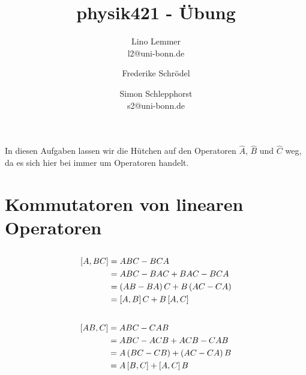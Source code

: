 

\setcounter{thezettel}{6}
\renewcommand\thesection{\arabic{thezettel}.\arabic{section}}

\newcommand\ccancel[2][black]{\renewcommand\CancelColor{\color{#1}}\cancel{#2}}


\title{physik421 - Übung }
\author{Lino Lemmer \\ \small{l2@uni-bonn.de} \and Frederike Schrödel \and Simon Schlepphorst\\ \small{s2@uni-bonn.de}}


\maketitle

In diesen Aufgaben lassen wir die Hütchen auf den Operatoren $\hat A$, $\hat B$
und $\hat C$ weg, da es sich hier bei immer um Operatoren handelt.

\section{Kommutatoren von linearen Operatoren}

\subsection{}

\begin{align*}
    \sbr{A,BC} &= ABC - BCA \\
               &= ABC - BAC + BAC -BCA \\
               &= \del{AB - BA}C + B\del{AC - CA} \\
               &= \sbr{A,B}C + B\sbr{A,C}
\end{align*}

\subsection{}

\begin{align*}
    \sbr{AB,C} &= ABC - CAB \\
               &= ABC - ACB + ACB - CAB \\
               &= A\del{BC-CB} + \del{AC-CA}B \\
               &= A\sbr{B,C} + \sbr{A,C}B
\end{align*}

\subsection{}

